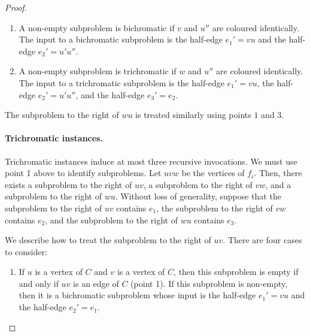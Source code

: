 \documentclass{patmorin}
\begin{document}
\begin{proof}
\begin{enumerate}
\begin{enumerate}
  \item A non-empty subproblem is bichromatic if $v$ and $u''$ are coloured identically. The input to a bichromatic subproblem is the half-edge $e_1'=vu$ and the half-edge $e_2'=u'u''$.
  
  \item A non-empty subproblem is trichromatic if $w$ and $u''$ are coloured identically. The input to a trichromatic subproblem is the half-edge $e_1'=vu$, the half-edge $e_2'=u'u''$, and the half-edge $e_3'=e_2$.
\end{enumerate}
\end{enumerate}
The subproblem to the right of $wu$ is treated similarly using points $1$ and $3$.

\paragraph{Trichromatic instances.} %
Trichromatic instances induce at most three recursive invocations. We must use point 1 above to identify subproblems. Let $uvw$ be the vertices of $f_i$. Then, there exists a subproblem to the right of $uv$, a subproblem to the right of $vw$, and a subproblem to the right of $wu$.  Without loss of generality, suppose that the subproblem to the right of $uv$ contains $e_1$, the subproblem to the right of $vw$ contains $e_2$, and the subproblem to the right of $wu$ contains $e_3$.

We describe how to treat the subproblem to the right of $uv$. There are four cases to consider:
\begin{enumerate}
  \item If $u$ is a vertex of $C$ and $v$ is a vertex of $C$, then this subproblem is empty if and only if $uv$ is an edge of $C$ (point 1). If this subproblem is non-empty, then it is a bichromatic subproblem whose input is the half-edge $e_1'=vu$ and the half-edge $e_2'=e_1$.



\end{enumerate}
\end{proof}
\end{document}
